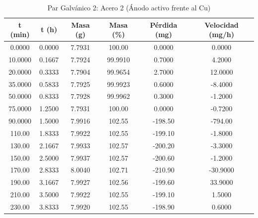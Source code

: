 \documentclass[11pt,a4paper]{article}
\begin{document}
\begin{table}[H]
\centering
\caption{Par Galvánico 2: Acero 2 (Ánodo activo frente al Cu)}
\label{tab:3_6_acero2}
\begin{tabular}{cccccc}
\toprule
t (min) & t (h) & Masa (g) & Masa (\%) & Pérdida (mg) & Velocidad (mg/h) \\
\midrule
0.0000 & 0.0000 & 7.7931 & 100.00 & 0.0000 & 0.0000 \\
10.0000 & 0.1667 & 7.7924 & 99.9910 & 0.7000 & 4.2000 \\
20.0000 & 0.3333 & 7.7904 & 99.9654 & 2.7000 & 12.0000 \\
35.0000 & 0.5833 & 7.7925 & 99.9923 & 0.6000 & -8.4000 \\
50.0000 & 0.8333 & 7.7928 & 99.9962 & 0.3000 & -1.2000 \\
75.0000 & 1.2500 & 7.7931 & 100.00 & 0.0000 & -0.7200 \\
90.0000 & 1.5000 & 7.9916 & 102.55 & -198.50 & -794.00 \\
110.00 & 1.8333 & 7.9922 & 102.55 & -199.10 & -1.8000 \\
130.00 & 2.1667 & 7.9933 & 102.57 & -200.20 & -3.3000 \\
150.00 & 2.5000 & 7.9937 & 102.57 & -200.60 & -1.2000 \\
170.00 & 2.8333 & 8.0040 & 102.71 & -210.90 & -30.9000 \\
190.00 & 3.1667 & 7.9927 & 102.56 & -199.60 & 33.9000 \\
210.00 & 3.5000 & 7.9922 & 102.55 & -199.10 & 1.5000 \\
230.00 & 3.8333 & 7.9920 & 102.55 & -198.90 & 0.6000 \\
\bottomrule
\end{tabular}
\end{table}
\end{document}
